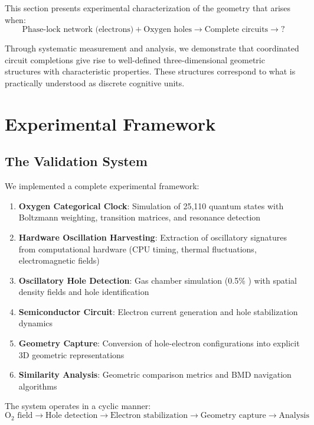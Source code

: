 This section presents experimental characterization of the geometry that arises when:
\begin{equation}
\text{Phase-lock network (electrons)} + \text{Oxygen holes} \to \text{Complete circuits} \to \text{?}
\end{equation}

Through systematic measurement and analysis, we demonstrate that coordinated circuit completions give rise to well-defined three-dimensional geometric structures with characteristic properties. These structures correspond to what is practically understood as discrete cognitive units.

\section{Experimental Framework}

\subsection{The Validation System}

We implemented a complete experimental framework:

\begin{enumerate}
\item \textbf{Oxygen Categorical Clock}: Simulation of 25,110  quantum states with Boltzmann weighting, transition matrices, and resonance detection
\item \textbf{Hardware Oscillation Harvesting}: Extraction of oscillatory signatures from computational hardware (CPU timing, thermal fluctuations, electromagnetic fields)
\item \textbf{Oscillatory Hole Detection}: Gas chamber simulation (0.5\% ) with spatial  density fields and hole identification
\item \textbf{Semiconductor Circuit}: Electron current generation and hole stabilization dynamics
\item \textbf{Geometry Capture}: Conversion of hole-electron configurations into explicit 3D geometric representations
\item \textbf{Similarity Analysis}: Geometric comparison metrics and BMD navigation algorithms
\end{enumerate}

The system operates in a cyclic manner:
\begin{equation}
\text{O}_2 \text{ field} \to \text{Hole detection} \to \text{Electron stabilization} \to \text{Geometry capture} \to \text{Analysis}
\end{equation}

